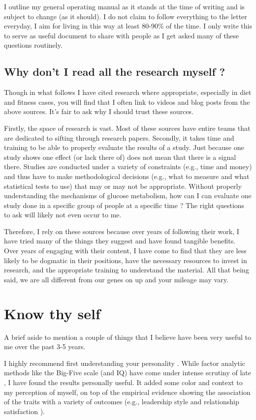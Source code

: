 \documentclass[10pt,twocolumn]{extarticle}
\begin{document}
I outline my general operating manual as it stands at the time of writing and is subject to change (as it should). I do not claim to follow everything to the letter everyday, I aim for living in this way at least 80-90\% of the time. I only write this to serve as useful document to share with people as I get asked many of these questions routinely. 

\subsection{Why don't I read all the research myself ?}

Though in what follows I have cited research where appropriate, especially in diet and fitness cases, you will find that I often link to videos and blog posts from the above sources. It's fair to ask why I should trust these sources.

Firstly, the space of research is vast. Most of these sources have entire teams that are dedicated to sifting through research papers. Secondly, it takes time and training to be able to properly evaluate the results of a study. Just because one study shows one effect (or lack there of) does not mean that there is a signal there. Studies are conducted under a variety of constraints (e.g., time and money) and thus have to make methodological decisions (e.g., what to measure and what statistical tests to use) that may or may not be appropriate. Without properly understanding the mechanisms of glucose metabolism, how can I can evaluate one study done in a specific group of people at a specific time ? The right questions to ask will likely not even occur to me.

Therefore, I rely on these sources because over years of following their work, I have tried many of the things they suggest and have found tangible benefits. Over years of engaging with their content, I have come to find that they are less likely to be dogmatic in their positions, have the necessary resources to invest in research, and the appropriate training to understand the material. All that being said, we are all different from our genes on up and your mileage may vary. 

\section{Know thy self}
A brief aside to mention a couple of things that I believe have been very useful to me over the past 3-5 years. 

I highly recommend first understanding your personality \cite{understandmyself2024}. While factor analytic methods like the Big-Five scale (and IQ) have come under intense scrutiny of late \cite{feher2021looking}, I have found the results personally useful. It added some color and context to my perception of myself, on top of the empirical evidence showing the association of the traits with a variety of outcomes (e.g., leadership style \cite{judge2000five} and relationship satisfaction \cite{o2019big}). 
\end{document}
